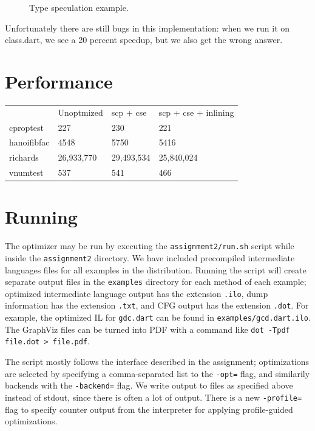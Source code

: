 \documentclass[10pt,twocolumn]{article}
\begin{document}
\begin{figure}
\begin{center}
\begin{minipage}{0.95\columnwidth}
  \caption{\label{fig:hammock} Type speculation example.}
\end{minipage}
\end{center}
\end{figure}

Unfortunately there are still bugs in this implementation: when we run
it on class.dart, we see a 20 percent speedup, but we also get the
wrong answer.

\section{Performance}

\begin{table}
\begin{tabular}{llll}
~           & Unoptmized & scp + cse  & scp + cse + inlining \\
cproptest   & 227        & 230        & 221                  \\
hanoifibfac & 4548       & 5750       & 5416                 \\
richards    & 26,933,770 & 29,493,534 & 25,840,024           \\
vnumtest    & 537        & 541        & 466                  \\
\end{tabular}
\end{table}


\section{Running}

The optimizer may be run by executing the \texttt{assignment2/run.sh}
script while inside the \texttt{assignment2} directory. We have
included precompiled intermediate languages files for all examples in
the distribution. Running the script will create separate output files
in the \texttt{examples} directory for each method of each example;
optimized intermediate language output has the extension
\texttt{.ilo}, dump information has the extension \texttt{.txt}, and
CFG output has the extension \texttt{.dot}. For example, the optimized
IL for \texttt{gdc.dart} can be found in
\texttt{examples/gcd.dart.ilo}. The GraphViz files can be turned into
PDF with a command like \texttt{dot -Tpdf file.dot > file.pdf}.

The script mostly follows the interface described in the assignment;
optimizations are selected by specifying a comma-separated list to the
\texttt{-opt=} flag, and similarily backends with the
\texttt{-backend=} flag. We write output to files as specified above
instead of stdout, since there is often a lot of output. There is a
new \texttt{-profile=} flag to specify counter output from the
interpreter for applying profile-guided optimizations.
\end{document}
